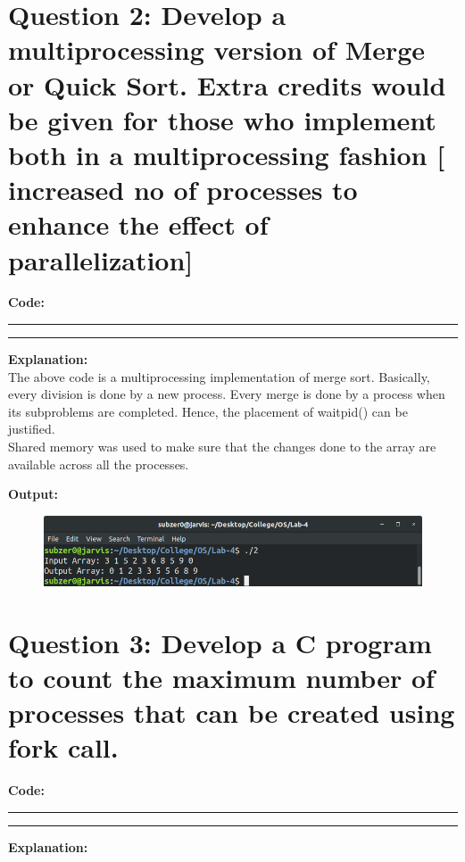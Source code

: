 \documentclass{article}
\begin{document}
\section*{Question 2: Develop a multiprocessing version of Merge or Quick Sort. Extra credits would be given for those who implement both in a multiprocessing fashion [ increased no of processes to enhance the effect of parallelization]}
\bigskip

\textbf{\Large Code:}
\smallskip
\par\noindent\rule{\textwidth}{0.4pt}

\par\noindent\rule{\textwidth}{0.4pt}

\bigskip
\noindent
\textbf{\Large Explanation: } \\

The above code is a multiprocessing implementation of merge sort. Basically,
every division is done by a new process. Every merge is done by a process 
when its subproblems are completed. Hence, the placement of waitpid() can be justified.
\\Shared memory was used to make sure that the changes done to the array are available across
all the processes.

\bigskip
\noindent
\textbf{\Large Output:}

\begin{figure}[h]
	\includegraphics[width=\textwidth]{output/2.png}
\end{figure}
\bigskip


\section*{Question 3: Develop a C program to count the maximum number of processes that can be created using fork call.}
\bigskip

\textbf{\Large Code:}
\smallskip
\par\noindent\rule{\textwidth}{0.4pt}

\par\noindent\rule{\textwidth}{0.4pt}

\bigskip
\noindent
\textbf{\Large Explanation: } \\
\end{document}
